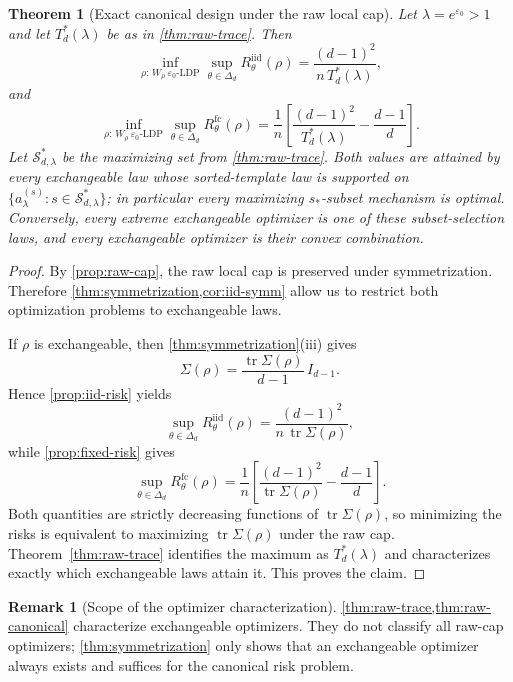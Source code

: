 \documentclass[11pt]{amsart}
\newtheorem{theorem}{Theorem}[section]
\theoremstyle{definition}
\newtheorem{remark}[remark]{Remark}
\DeclareMathOperator{\tr}{tr}
\newcommand{\cS}{\mathcal S}
\begin{document}
\begin{theorem}[Exact canonical design under the raw local cap]\label{thm:raw-canonical}
Let $\lambda=e^{\varepsilon_0}>1$ and let $T_d^*(\lambda)$ be as in \cref{thm:raw-trace}. Then
\[
\inf_{\rho:\,W_\rho\ \varepsilon_0\text{-LDP}}
\sup_{\theta\in\Delta_d}
R^{\mathrm{iid}}_\theta(\rho)
=
\frac{(d-1)^2}{n\,T_d^*(\lambda)},
\]
and
\[
\inf_{\rho:\,W_\rho\ \varepsilon_0\text{-LDP}}
\sup_{\theta\in\Delta_d}
R^{\mathrm{fc}}_\theta(\rho)
=
\frac1n\left[
\frac{(d-1)^2}{T_d^*(\lambda)}
-\frac{d-1}{d}
\right].
\]
Let $\cS_{d,\lambda}^*$ be the maximizing set from \cref{thm:raw-trace}. Both values are attained by every exchangeable law whose sorted-template law is supported on $\{a^{(s)}_\lambda:s\in \cS_{d,\lambda}^*\}$; in particular every maximizing $s_*$-subset mechanism is optimal. Conversely, every extreme exchangeable optimizer is one of these subset-selection laws, and every exchangeable optimizer is their convex combination.
\end{theorem}

\begin{proof}
By \cref{prop:raw-cap}, the raw local cap is preserved under symmetrization. Therefore \cref{thm:symmetrization,cor:iid-symm} allow us to restrict both optimization problems to exchangeable laws.

If $\rho$ is exchangeable, then \cref{thm:symmetrization}(iii) gives
\[
\Sigma(\rho)=\frac{\tr\Sigma(\rho)}{d-1}\,I_{d-1}.
\]
Hence \cref{prop:iid-risk} yields
\[
\sup_{\theta\in\Delta_d} R^{\mathrm{iid}}_\theta(\rho)
=
\frac{(d-1)^2}{n\,\tr\Sigma(\rho)},
\]
while \cref{prop:fixed-risk} gives
\[
\sup_{\theta\in\Delta_d} R^{\mathrm{fc}}_\theta(\rho)
=
\frac1n\left[
\frac{(d-1)^2}{\tr\Sigma(\rho)}
-\frac{d-1}{d}
\right].
\]
Both quantities are strictly decreasing functions of $\tr\Sigma(\rho)$, so minimizing the risks is equivalent to maximizing $\tr\Sigma(\rho)$ under the raw cap. Theorem~\ref{thm:raw-trace} identifies the maximum as $T_d^*(\lambda)$ and characterizes exactly which exchangeable laws attain it. This proves the claim.
\end{proof}

\begin{remark}[Scope of the optimizer characterization]
\cref{thm:raw-trace,thm:raw-canonical} characterize exchangeable optimizers. They do not classify all raw-cap optimizers; \cref{thm:symmetrization} only shows that an exchangeable optimizer always exists and suffices for the canonical risk problem.
\end{remark}
\end{document}
